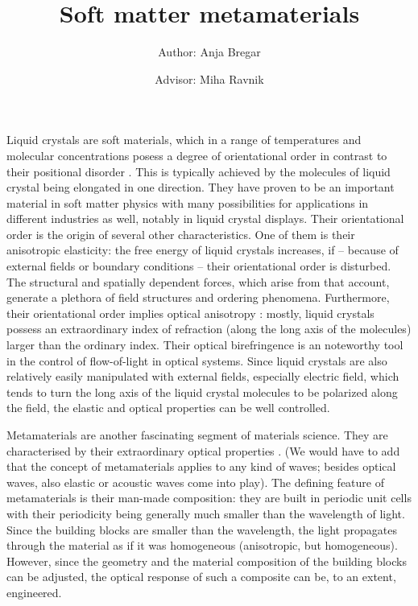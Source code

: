 \documentclass[a4paper,11pt]{article}
\title{\huge{Soft matter metamaterials}}
\author{Author: Anja Bregar \and Advisor: Miha Ravnik}
\begin{document}
\onehalfspacing

\maketitle

% 
% 
% 
%



Liquid crystals are soft materials, which in a range of temperatures and molecular concentrations posess a degree of orientational order in contrast to their positional disorder \cite{degennes}. 
This is typically achieved by the molecules of liquid crystal being elongated in one direction.  
They have proven to be an important material in soft matter physics with many possibilities for applications in different industries as well, notably in liquid crystal displays.
Their orientational order is the origin of several other characteristics. 
One of them is their anisotropic elasticity: the free energy of liquid crystals increases, if -- because of external fields or boundary conditions -- their orientational order is disturbed. 
The structural and spatially dependent forces, which arise from that account, generate a plethora of field structures and ordering phenomena. 
Furthermore, their orientational order implies optical anisotropy \cite{hecht-optics}: mostly, liquid crystals possess an extraordinary index of refraction (along the long axis of the molecules) larger than the ordinary index. 
Their optical birefringence is an noteworthy tool in the control of flow-of-light in optical systems. 
Since liquid crystals are also relatively easily manipulated with external fields, especially electric field, which tends to turn the long axis of the liquid crystal molecules to be polarized along the field, the elastic and optical properties can be well controlled.






Metamaterials are another fascinating segment of materials science. 
They are characterised by their extraordinary optical properties \cite{gja}.
(We would have to add that the concept of metamaterials applies to any kind of waves; besides optical waves, also elastic or acoustic waves come into play). 
The defining feature of metamaterials is their man-made composition: they are built in periodic unit cells with their periodicity being generally much smaller than the wavelength of light. 
Since the building blocks are smaller than the wavelength, the light propagates through the material as if it was homogeneous (anisotropic, but homogeneous). 
However, since the geometry and the material composition of the building blocks can be adjusted, the optical response of such a composite can be, to an extent, engineered. 
\end{document}
